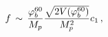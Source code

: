 \begin{equation} \label{res1}
f \, \sim \, {{\varphi_b^{60}} \over {M_p}} 
{{\sqrt{2 V(\varphi_b^{60})}} \over {M_p^2}} c_1 \, ,
\end{equation}

